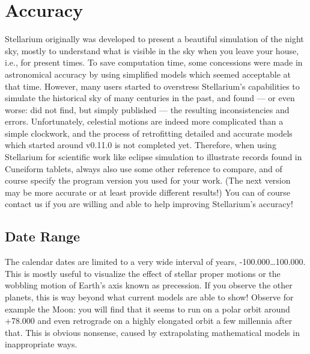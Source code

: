 

\chapter{Accuracy}
\label{ch:Accuracy}

Stellarium originally was developed to present a beautiful simulation
of the night sky, mostly to understand what is visible in the sky when
you leave your house, i.e., for present times. To save computation
time, some concessions were made in astronomical accuracy by using
simplified models which seemed acceptable at that time. However, many
users started to overstress Stellarium's capabilities to simulate the
historical sky of many centuries in the past, and found --- or even worse: 
did not find, but simply published --- the resulting inconsistencies and errors.  
Unfortunately, celestial motions are indeed more
complicated than a simple clockwork, and the process of retrofitting
detailed and accurate models which started around v0.11.0 is not
completed yet. Therefore, when using Stellarium for scientific work
like eclipse simulation to illustrate records found in Cuneiform
tablets, always also use some other reference to compare, and of 
course specify the program version you used for your work. (The next version 
may be more accurate or at least provide different results!) You can of
course contact us if you are willing and able to help improving
Stellarium's accuracy!

\section{Date Range}
\label{sec:Accuracy:DateRange}

The calendar dates are limited to a very wide interval of years, -100.000\ldots100.000. 
This is mostly useful to visualize the effect of stellar proper motions or the wobbling 
motion of Earth's axis known as precession. 
If you observe the other planets, this is way beyond what current models are able to show! 
Observe for example the Moon: you will find that it seems to run 
on a polar orbit around +78.000 and even retrograde on a highly elongated orbit a few millennia after that. 
This is obvious nonsense, caused by extrapolating mathematical models in inappropriate ways. 


